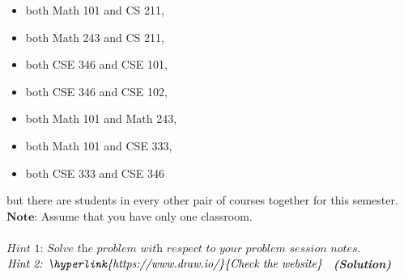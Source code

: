 \documentclass[a4 paper]{article}
\numberwithin{equation}{section}
\newcommand{\solution}{~\newline\textbf{\textit{(Solution)}} }
\newcommand{\0}{\mathbf{0}}
\begin{document}
\begin{itemize}
	\item both Math 101 and CS 211,
	\item both Math 243 and CS 211,
	\item both CSE 346 and CSE 101,
	\item both CSE 346 and CSE 102,
	\item both Math 101 and Math 243,
	\item both Math 101 and CSE 333,
	\item both CSE 333 and CSE 346
\end{itemize}
but there are students in every other pair of courses together for this semester.\\ 
$\textbf{Note:}$ Assume that you have only one classroom.\\ \\
$\textit{Hint 1: Solve the problem with respect to your problem session notes.}$\\
$\textit{Hint 2: \hyperlink{https://www.draw.io/}{Check the website}}$
\newline
\solution
\end{document}
